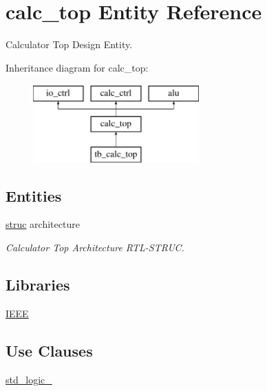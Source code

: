 \hypertarget{classcalc__top}{}\section{calc\+\_\+top Entity Reference}
\label{classcalc__top}


Calculator Top Design Entity.  


Inheritance diagram for calc\+\_\+top\+:\begin{figure}[H]
\begin{center}
\leavevmode
\includegraphics[height=3.000000cm]{classcalc__top}
\end{center}
\end{figure}
\subsection*{Entities}
\begin{DoxyCompactItemize}
\item 
\hyperlink{classcalc__top_1_1struc}{struc} architecture
\begin{DoxyCompactList}\small\item\em Calculator Top Architecture R\+T\+L-\/\+S\+T\+R\+UC. \end{DoxyCompactList}\end{DoxyCompactItemize}
\subsection*{Libraries}
 \begin{DoxyCompactItemize}
\item 
\hyperlink{classcalc__top_ae4f03c286607f3181e16b9aa12d0c6d4}{I\+E\+EE} 
\end{DoxyCompactItemize}
\subsection*{Use Clauses}
 \begin{DoxyCompactItemize}
\item 
\hyperlink{classcalc__top_acd03516902501cd1c7296a98e22c6fcb}{std\+\_\+logic\+\_}   
\end{DoxyCompactItemize}
